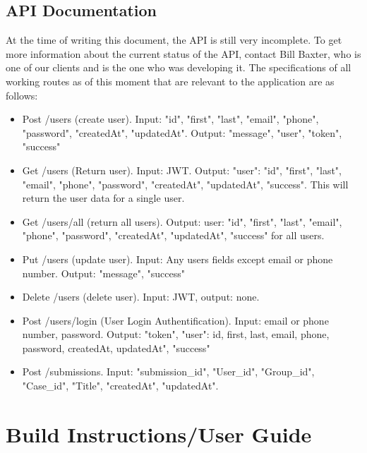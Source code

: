 \documentclass[onecolumn, draftclsnofoot,10pt, compsoc]{IEEEtran}
\begin{document}
 \subsection{API Documentation}
 At the time of writing this document, the API is still very incomplete. To get more information about the current status of the API, contact Bill Baxter, who is one of our clients and is the one who was developing it. The specifications of all working routes as of this moment that are relevant to the application are as follows:
 \begin{itemize}
     \item Post /users (create user). Input: {"id", "first", "last", "email", "phone", "password", "createdAt", "updatedAt"}. Output: {"message", "user", "token", "success"}
     
     \item Get /users (Return user). Input: JWT. Output: {"user": {"id", "first", "last", "email", "phone", "password", "createdAt", "updatedAt"}, "success"}. This will return the user data for a single user.
     
     \item Get /users/all (return all users). Output: {user: {"id", "first", "last", "email", "phone", "password", "createdAt", "updatedAt"}, "success"} for all users.
     
     \item Put /users (update user). Input: Any users fields except email or phone number. Output: {"message", "success"}
     
     \item Delete /users (delete user). Input: JWT, output: none.
     
     
     \item Post /users/login (User Login Authentification). Input: {email or phone number, password}. Output: { "token", "user": {id, first, last, email, phone, password, createdAt, updatedAt"}, "success"}
     
     \item Post /submissions. Input: {"submission\_id", "User\_id", "Group\_id", "Case\_id", "Title", "createdAt", "updatedAt"}.
     

 \end{itemize}
 \section{Build Instructions/User Guide}
\end{document}
